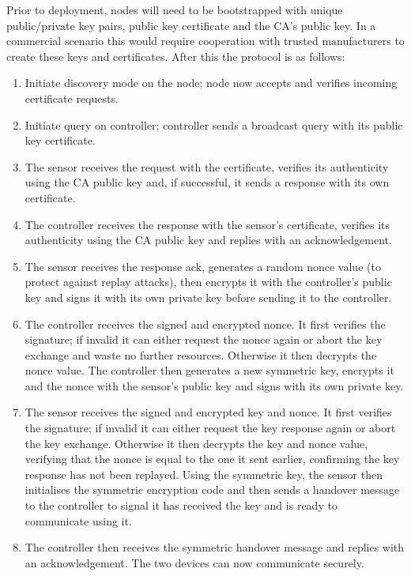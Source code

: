 \documentclass[conference]{./sty/IEEEtran}
\begin{document}
Prior to deployment, nodes will need to be bootstrapped with unique public/private key pairs, public key certificate and the CA's public key. In a commercial scenario this would require cooperation with trusted manufacturers to create these keys and certificates. After this the protocol is as follows:
\begin{enumerate}
  \item Initiate discovery mode on the node; node now accepts and verifies incoming certificate requests.
  \item Initiate query on controller; controller sends a broadcast query with its public key certificate.
  \item The sensor receives the request with the certificate, verifies its authenticity using the CA public key and, if successful, it sends a response with its own certificate.
  \item The controller receives the response with the sensor's certificate, verifies its authenticity using the CA public key and replies with an acknowledgement.
  \item The sensor receives the response ack, generates a random nonce value (to protect against replay attacks), then encrypts it with the controller's public key and signs it with its own private key before sending it to the controller.
  \item The controller receives the signed and encrypted nonce. It first verifies the signature; if invalid it can either request the nonce again or abort the key exchange and waste no further resources. Otherwise it then decrypts the nonce value. The controller then generates a new symmetric key, encrypts it and the nonce with the sensor's public key and signs with its own private key.
  \item The sensor receives the signed and encrypted key and nonce. It first verifies the signature; if invalid it can either request the key response again or abort the key exchange. Otherwise it then decrypts the key and nonce value, verifying that the nonce is equal to the one it sent earlier, confirming the key response has not been replayed. Using the symmetric key, the sensor then initialises the symmetric encryption code and then sends a handover message to the controller to signal it has received the key and is ready to communicate using it.
  \item The controller then receives the symmetric handover message and replies with an acknowledgement. The two devices can now communicate securely.
\end{enumerate} 
\end{document}
